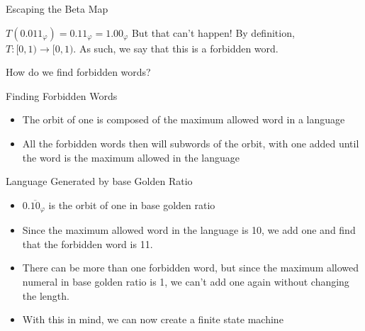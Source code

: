 \documentclass{beamer}
\begin{document}
          \begin{frame}{Escaping the Beta Map}
            \begin{example}[$T(0.011_\varphi)$]
              $T(0.011_\varphi)=0.11_\varphi=1.00_\varphi$
              But that can't happen! By definition, $T:[0,1)\to[0,1)$. As such, we say that this is a forbidden word.

              How do we find forbidden words?
            \end{example}
          \end{frame}

          \begin{frame}{Finding Forbidden Words}
            \begin{itemize}
              \item The orbit of one is composed of the maximum allowed word in a language
              \item All the forbidden words then will subwords of the orbit, with one added until the word is the maximum allowed in the language
            \end{itemize}
          \end{frame}

          \begin{frame}{Language Generated by base Golden Ratio}
            \begin{itemize}
              \item $0.\overline{10}_\varphi$ is the orbit of one in base golden ratio
              \item Since the maximum allowed word in the language is 10, we add one and find that the forbidden word is 11.
              \item There can be more than one forbidden word, but since the maximum allowed numeral in base golden ratio is 1, we can't add one again without changing the length.
              \item With this in mind, we can now create a finite state machine
            \end{itemize}
          \end{frame}
\end{document}
